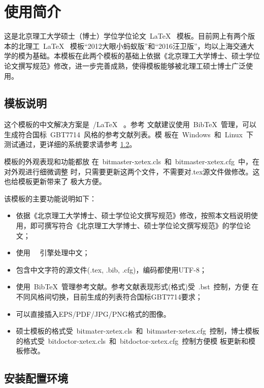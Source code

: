 
\chapter{使用简介}
\label{chap:what}

这是北京理工大学硕士（博士）学位学位论文~\LaTeX~ 模板。目前网上有两个版本的北理工~\LaTeX~ 模板“2012大眼小蚂蚁版”和“2016汪卫版”，均以上海交通大学的模为基础。本模板在此两个模板的基础上依据《北京理工大学博士、硕士学位论文撰写规范》修改，进一步完善成熟，使得模板能够被北理工硕士博士广泛使用。

\section{模板说明}
\label{sec:features}

这个模板的中文解决方案是~\XeTeX/\LaTeX~ 。参考
文献建议使用~BibTeX~管理，可以生成符合国标~GBT7714~风格的参考文献列表。模
板在~Windows~和~Linux~下测试通过，更详细的系统要求请参考
\ref{sec:requirements}。

模板的外观表现和功能都放
在~bitmaster-xetex.cls~和~bitmaster-xetex.cfg~中，在对外观进行细微调整
时，只需要更新这两个文件，不需要对.tex源文件做修改。这也给模板更新带来了
极大方便。

该模板的主要功能说明如下：

\begin{itemize}
\item \inv 依据《北京理工大学博士、硕士学位论文撰写规范》修改，按照本文档说明使用，即可撰写符合《北京理工大学博士、硕士学位论文撰写规范》的学位论文；
\item \inv 使用~\XeTeX~ 引擎处理中文；
\item \inv 包含中文字符的源文件(.tex, .bib, .cfg)，编码都使用UTF-8；
\item \inv 使用~BibTeX~管理参考文献。参考文献表现形式(格式)受~.bst~控制，方便
  在不同风格间切换，目前生成的列表符合国标GBT7714要求；
\item \inv 可以直接插入EPS/PDF/JPG/PNG格式的图像。
\item \inv 硕士模板的格式受~bitmater-xetex.cls~和~bitmaster-xetex.cfg~控制，博士模板的格式受~bitdoctor-xetex.cls~和~bitdoctor-xetex.cfg~控制方便模
  板更新和模板修改。
\end{itemize}

\section{安装配置环境}
\label{sec:requirements}

